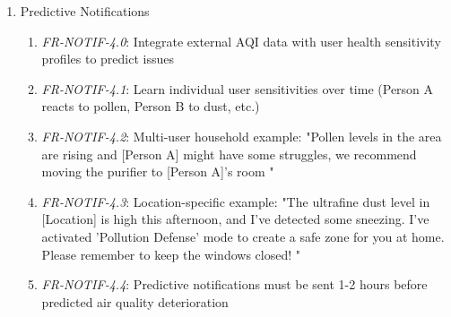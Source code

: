 \documentclass[conference]{IEEEtran}
\begin{document}
\begin{enumerate}
                        \begin{enumerate}
                            \item \textit{FR-NOTIF-3.0}: Monitor cough/sneeze detection events and trigger notifications when threshold exceeded
                            \item \textit{FR-NOTIF-3.1}: Threshold definition: 5+ cough events or 8+ sneeze events within 30-minute window
                            \item \textit{FR-NOTIF-3.2}: Example responsive notification: "We've noticed you have been coughing quite a bit lately, I've turned on Pollen Protection Mode to help out "
                            \item \textit{FR-NOTIF-3.3}: Automatic action must be taken simultaneously with notification (e.g., activate protection mode)
                            \item \textit{FR-NOTIF-3.4}: Follow-up notification after 2 hours: "How are you feeling? The air should be much cleaner now"
                            \item \textit{FR-NOTIF-3.5}: Avoid sending duplicate responsive notifications within 4-hour window for same symptom type
                        \end{enumerate}
                    \item Predictive Notifications
                        \begin{enumerate}
                            \item \textit{FR-NOTIF-4.0}: Integrate external AQI data with user health sensitivity profiles to predict issues
                            \item \textit{FR-NOTIF-4.1}: Learn individual user sensitivities over time (Person A reacts to pollen, Person B to dust, etc.)
                            \item \textit{FR-NOTIF-4.2}: Multi-user household example: "Pollen levels in the area are rising and [Person A] might have some struggles, we recommend moving the purifier to [Person A]'s room "
                            \item \textit{FR-NOTIF-4.3}: Location-specific example: "The ultrafine dust level in [Location] is high this afternoon, and I've detected some sneezing. I've activated 'Pollution Defense' mode to create a safe zone for you at home. Please remember to keep the windows closed! "
                            \item \textit{FR-NOTIF-4.4}: Predictive notifications must be sent 1-2 hours before predicted air quality deterioration

\end{enumerate}
\end{enumerate}
\end{document}
